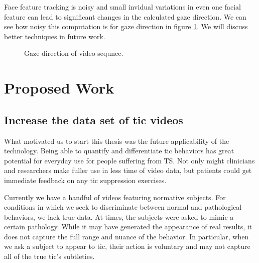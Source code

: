 \documentclass[11pt]{article}
\begin{document}
Face feature tracking is noisy and small invidual variations in even one facial feature can lead to significant changes in the calculated gaze direction. We can see how noisy this computation is for gaze direction in figure \ref{gazegraph}. We will discuss better techniques in future work.
\begin{figure}%
    \centering
    \caption{Gaze direction of video sequnce.}
    \label{gazegraph}%
\end{figure}

\section{Proposed Work}
\subsection{Increase the data set of tic videos}
What motivated us to start this thesis was the future applicability of the technology. Being able to quantify and differentiate tic behaviors has great potential for everyday use for people suffering from TS. Not only might clinicians and researchers make fuller use in less time of video data, but patients could get immediate feedback on any tic suppression exercises.

Currently we have a handful of videos featuring normative subjects. For conditions in which we seek to discriminate between normal and pathological behaviors, we lack true data. At times, the subjects were asked to mimic a certain pathology. While it may have generated the appearance of real results, it does not capture the full range and nuance of the behavior. In particular, when we ask a subject to appear to tic, their action is voluntary and may not capture all of the true tic's subtleties.
\end{document}
